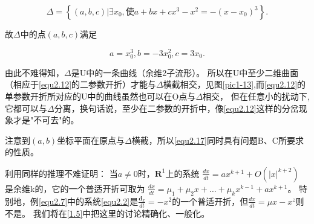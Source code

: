     \[
      \Delta = \left\{
        ( a , b , c ) \left| \exists x _ { 0 }\right.,使a + b x + c x ^ { 3 } - x ^ { 2 } = - \left( x - x _ { 0 } \right) ^ { 3 }
      \right\}.
    \]
    
    故\(\Delta\)中的点\((a,b,c)\)满足
    
    \[
a =x _ { 0 } ^ { 3 } , b = - 3 x _ { 0 } ^ { 2 } , c = 3 x _ { 0 }.
\]

由此不难得知，\(\Delta\)是U中的一条曲线（余维2子流形）。
所以在U中至少二维曲面（相应于\ref{equ2.12}的二参数开折）才能与\(\Delta\)横截相交，见图\ref{pic1-13},而\ref{equ2.12}的单参数开折所对应的U中的曲线虽然也可以在O点与\(\Delta\)相交，
但在任意小的扰动下,它都可以与\(\Delta\)分离，换句话说，至少在二参数的开折中，像\ref{equ2.12}这样的分岔现象才是"不可去"的。


注意到\((a,b)\)坐标平面在原点与\(\Delta\)横截，所以\ref{equ2.17}同时具有问题B、C所要求的性质。


\begin{corollary}
  利用同样的推理不难证明：
  当\(a\neq 0\)时，$\mathbf { R } ^ { 1 }$上的系统
  $\frac { d x } { d t} = a x ^ { k + 1 } + O \left( | x | ^ { k + 2 } \right)$
  是余维k的，它的一个普适开折可取为
  $\frac { d x } { d t } = \mu _ { 1 } + \mu _ { 2 } x + \dots + \mu _ { k } x ^ { k - 1 } + a x ^ { k + 1 }$。
  特别地，例\ref{equ2.7}中的系统\ref{equ2.2}是$\frac { \mathbf { d } _ { x } } { d t } = - x ^ { 2 }$的一个普适开折，但$\frac { d x } { d t } = \mu x - x ^ { z }$则不是。
  我们将在\ref{1.5}中把这里的讨论精确化、一般化。
\end{corollary}

